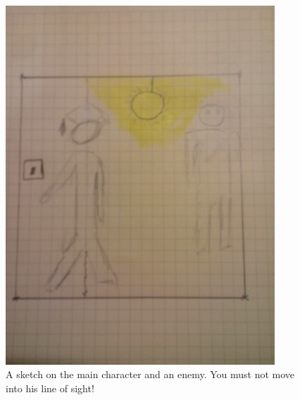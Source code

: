 \documentclass[12pt]{article}
\begin{document}
\begin{figure}
	\centering
	\begin{minipage}{0.45\textwidth}
		\centering
		\includegraphics[width=0.9\textwidth]{Images/lighton} %
		\caption{A sketch on the main character and an enemy. You must not move into his line of sight!}
	\end{minipage}\hfill
	\begin{minipage}{0.45\textwidth}
		\centering

\end{minipage}
\end{figure}
\end{document}
